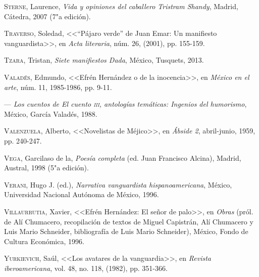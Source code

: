 \documentclass[14pt,twoside,final]{extbook} %
\begin{document}
\textsc{Sterne}, Laurence, \emph{Vida y opiniones del caballero Tristram Shandy}, Madrid, Cátedra, 2007 (7"a edición).\label{bib:sterne2007}

\textsc{Traverso}, Soledad, <<``Pájaro verde'' de Juan Emar: Un manifiesto vanguardista>>, en \emph{Acta literaria}, núm. 26, (2001), pp. 155-159.\label{bib:traverzo2001}

\textsc{Tzara}, Tristan, \emph{Siete manifiestos Dada}, México, Tusquets, 2013.\label{bib:tzara2013}

\textsc{Valadés}, Edmundo, <<Efrén Hernández o de la inocencia>>, en \emph{México en el arte}, núm. 11, 1985-1986, pp. 9-11.\label{bib:valades1985}

--- \emph{Los cuentos de \emph{El cuento} \textsc{iii}, antologías temáticas: Ingenios del humorismo}, México, García Valadés, 1988.\label{bib:valades1988}

\textsc{Valenzuela}, Alberto, <<Novelistas de Méjico>>, en \emph{Ábside 2}, abril-junio, 1959, pp. 240-247.\label{bib:valenzuela1959}

\textsc{Vega}, Garcilaso de la, \emph{Poesía completa} (ed. Juan Francisco Alcina), Madrid, Austral, 1998 (5"a edición).\label{bib:vega1998}

\textsc{Verani}, Hugo J. (ed.), \emph{Narrativa vanguardista hispanoamericana}, México, Universidad Nacional Autónoma de México, 1996.\label{bib:verani1996}

\textsc{Villaurrutia}, Xavier, <<Efrén Hernández: El señor de palo>>, en \emph{Obras} (pról. de Alí Chumacero, recopilación de textos de Miguel Capistrán, Alí Chumacero y Luis Mario Schneider, bibliografía de Luis Mario Schneider), México, Fondo de Cultura Económica, 1996.\label{bib:villaurrutia1996}

\textsc{Yurkievich}, Saúl, <<Los avatares de la vanguardia>>, en \emph{Revista iberoamericana}, vol. 48, no. 118, (1982), pp. 351-366.\label{bib:yurkievich1982}
\end{document}
